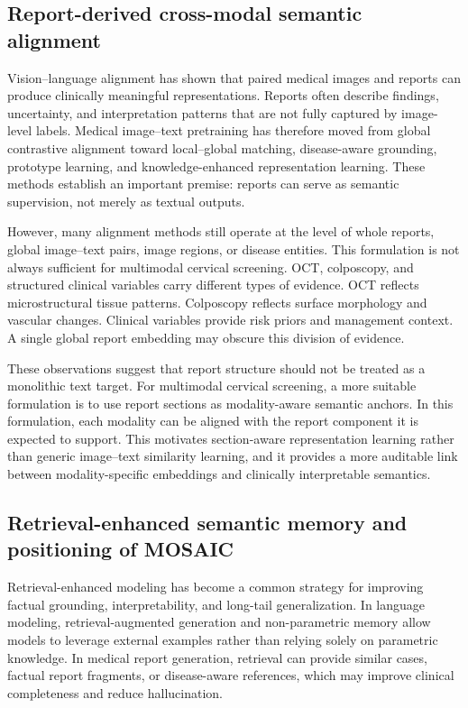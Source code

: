 \documentclass[11pt, a4paper]{article}
\theoremstyle{plain}
\theoremstyle{definition}
\begin{document}
\subsection{Report-derived cross-modal semantic alignment}

Vision--language alignment has shown that paired medical images and reports can produce clinically meaningful representations. Reports often describe findings, uncertainty, and interpretation patterns that are not fully captured by image-level labels. Medical image--text pretraining has therefore moved from global contrastive alignment toward local--global matching, disease-aware grounding, prototype learning, and knowledge-enhanced representation learning. These methods establish an important premise: reports can serve as semantic supervision, not merely as textual outputs.

However, many alignment methods still operate at the level of whole reports, global image--text pairs, image regions, or disease entities. This formulation is not always sufficient for multimodal cervical screening. OCT, colposcopy, and structured clinical variables carry different types of evidence. OCT reflects microstructural tissue patterns. Colposcopy reflects surface morphology and vascular changes. Clinical variables provide risk priors and management context. A single global report embedding may obscure this division of evidence.

These observations suggest that report structure should not be treated as a monolithic text target. For multimodal cervical screening, a more suitable formulation is to use report sections as modality-aware semantic anchors. In this formulation, each modality can be aligned with the report component it is expected to support. This motivates section-aware representation learning rather than generic image--text similarity learning, and it provides a more auditable link between modality-specific embeddings and clinically interpretable semantics.

\subsection{Retrieval-enhanced semantic memory and positioning of MOSAIC}

Retrieval-enhanced modeling has become a common strategy for improving factual grounding, interpretability, and long-tail generalization. In language modeling, retrieval-augmented generation and non-parametric memory allow models to leverage external examples rather than relying solely on parametric knowledge. In medical report generation, retrieval can provide similar cases, factual report fragments, or disease-aware references, which may improve clinical completeness and reduce hallucination.
\end{document}
